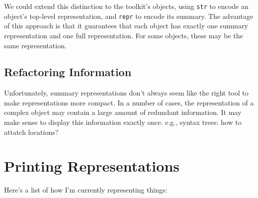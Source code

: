 \documentclass[11pt]{article}
\begin{document}
  We could extend this distinction to the toolkit's objects, using
  \texttt{str} to encode an object's top-level representation, and
  \texttt{repr} to encode its summary.  The advantage of this approach
  is that it guarantees that each object has exactly one summary
  representation and one full representation.  For some objects, these
  may be the same representation.

\subsection{Refactoring Information}

  Unfortunately, summary representations don't always seem like the
  right tool to make representations more compact.  In a number of
  cases, the representation of a complex object may contain a large
  amount of redundant information.  It may make sense to display this
  information exactly once.  e.g., syntax trees: how to attatch
  locations?

\section{Printing Representations}

Here's a list of how I'm currently representing things:
\end{document}

